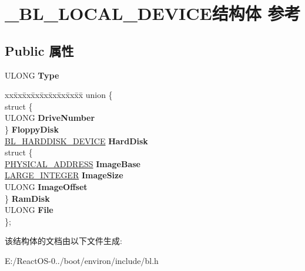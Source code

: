 \hypertarget{struct___b_l___l_o_c_a_l___d_e_v_i_c_e}{}\section{\+\_\+\+B\+L\+\_\+\+L\+O\+C\+A\+L\+\_\+\+D\+E\+V\+I\+C\+E结构体 参考}
\label{struct___b_l___l_o_c_a_l___d_e_v_i_c_e}
\subsection*{Public 属性}
\begin{DoxyCompactItemize}
\item 
\mbox{\label{struct___b_l___l_o_c_a_l___d_e_v_i_c_e_a795210360cde5a72ef8fc568c235f4b3}} 
U\+L\+O\+NG {\bfseries Type}
\item 
\mbox{\label{struct___b_l___l_o_c_a_l___d_e_v_i_c_e_a66faf633b8ab893188c170b5ce8f1231}} 
\begin{tabbing}
xx\=xx\=xx\=xx\=xx\=xx\=xx\=xx\=xx\=\kill
union \{\\
\>struct \{\\
\>\>ULONG {\bfseries DriveNumber}\\
\>\} {\bfseries FloppyDisk}\\
\>\hyperlink{struct___b_l___h_a_r_d_d_i_s_k___d_e_v_i_c_e}{BL\_HARDDISK\_DEVICE} {\bfseries HardDisk}\\
\>struct \{\\
\>\>\hyperlink{union___l_a_r_g_e___i_n_t_e_g_e_r}{PHYSICAL\_ADDRESS} {\bfseries ImageBase}\\
\>\>\hyperlink{union___l_a_r_g_e___i_n_t_e_g_e_r}{LARGE\_INTEGER} {\bfseries ImageSize}\\
\>\>ULONG {\bfseries ImageOffset}\\
\>\} {\bfseries RamDisk}\\
\>ULONG {\bfseries File}\\
\}; \\

\end{tabbing}\end{DoxyCompactItemize}


该结构体的文档由以下文件生成\+:\begin{DoxyCompactItemize}
\item 
E\+:/\+React\+O\+S-\/0../boot/environ/include/bl.\+h\end{DoxyCompactItemize}
